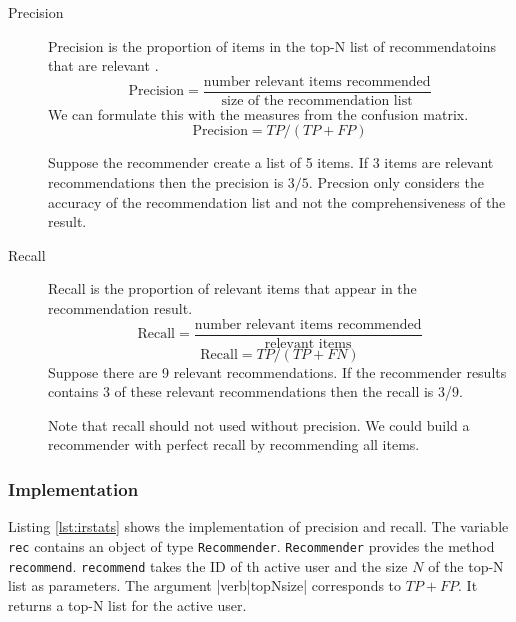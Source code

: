 \begin{description}
\item[Precision] Precision is the proportion of items in the top-N list of recommendatoins that are relevant \cite{Manning}.
  \begin{equation}
    \label{eq:precision}
    \text{Precision} = \frac{\text{number relevant items recommended}}{\text{size of the recommendation list}}
  \end{equation}
We can formulate this with the measures from the confusion matrix.
  \begin{equation}
    \label{eq:recallcm}
    \text{Precision} = TP/(TP+FP)
  \end{equation}

 Suppose the recommender create a list of 5 items. If 3 items are relevant recommendations then the precision is $3/5$. 
Precsion only considers the accuracy of the recommendation list and not the comprehensiveness of the result.

\item[Recall] Recall is the proportion of relevant items that appear in the recommendation result. 
  \begin{equation}
    \label{eq:recall}
    \text{Recall} = \frac{\text{number relevant items recommended}}{\text{relevant items}}
  \end{equation}
  \begin{equation}
    \label{eq:recallcm}
    \text{Recall} = TP/(TP+FN)
  \end{equation}
Suppose there are 9 relevant recommendations. If the recommender results contains 3 of these relevant recommendations then the recall is 3/9.

Note that recall should not used without precision. We could build a recommender with perfect recall by recommending all items.
\end{description}

\subsubsection{Implementation}
\label{sec:irimpl}

Listing \ref{lst:irstats} shows the implementation of precision and recall. 
The variable \verb|rec| contains an object of type \verb|Recommender|. \verb|Recommender| provides the method \verb|recommend|. \verb|recommend| takes the ID of th active user and the size $N$ of the top-N list as parameters. The argument |verb|topNsize| corresponds to $TP+FP$. It returns a top-N list for the active user. 

